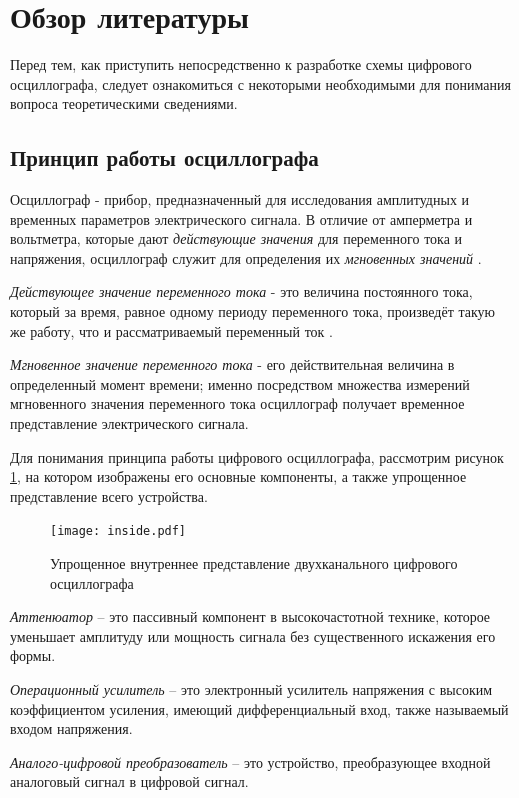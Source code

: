 \section{Обзор литературы}

Перед тем, как приступить непосредственно к разработке схемы цифрового осциллографа, следует ознакомиться с некоторыми необходимыми для понимания вопроса теоретическими сведениями.

\subsection{Принцип работы осциллографа}

Осциллограф - прибор, предназначенный для исследования амплитудных и временных параметров электрического сигнала. В отличие от амперметра и вольтметра, которые дают \textit{действующие значения} для переменного тока и напряжения, осциллограф служит для определения их \textit{мгновенных значений} \cite[с. 381]{esbe}.

\emph{Действующее значение переменного тока} - это величина постоянного тока, который за время, равное одному периоду переменного тока, произведёт такую же работу, что и рассматриваемый переменный ток \cite{yavorskiy}.

\emph{Мгновенное значение переменного тока} - его действительная величина в определенный момент времени;
именно посредством множества измерений мгновенного значения переменного тока осциллограф получает временное представление электрического сигнала.

Для понимания принципа работы цифрового осциллографа, рассмотрим рисунок
\ref{fig:inside}, на котором изображены его основные компоненты, а также упрощенное представление всего устройства.

\begin{figure}[H]
    \centering
    \texttt{[image: inside.pdf]}
    \caption{Упрощенное внутреннее представление двухканального цифрового осциллографа}
    \label{fig:inside}
\end{figure}

\emph{Аттенюатор} -- это пассивный компонент в высокочастотной технике, которое уменьшает амплитуду или мощность сигнала без существенного искажения его формы.

\emph{Операционный усилитель} --  это электронный усилитель напряжения с высоким коэффициентом усиления, имеющий дифференциальный вход, также называемый входом напряжения.

\emph{Аналого-цифровой преобразователь} -- это устройство, преобразующее входной аналоговый сигнал в цифровой сигнал.

